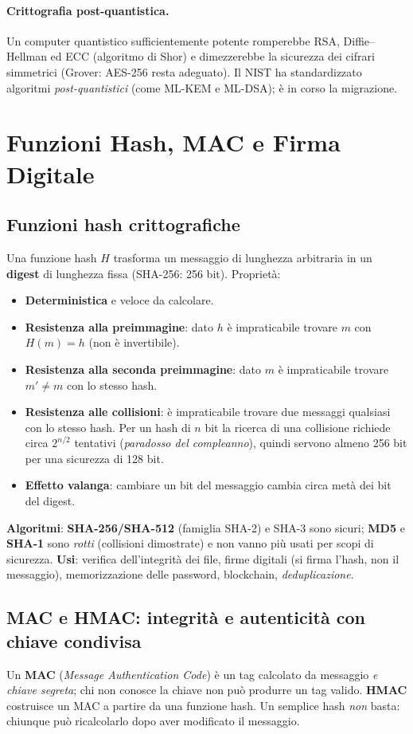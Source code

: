 \paragraph{Crittografia post-quantistica.} Un computer quantistico sufficientemente potente romperebbe RSA, Diffie--Hellman ed ECC (algoritmo di Shor) e dimezzerebbe la sicurezza dei cifrari simmetrici (Grover: AES-256 resta adeguato). Il NIST ha standardizzato algoritmi \emph{post-quantistici} (come ML-KEM e ML-DSA); è in corso la migrazione.

\section{Funzioni Hash, MAC e Firma Digitale}

\subsection{Funzioni hash crittografiche}
Una funzione hash $H$ trasforma un messaggio di lunghezza arbitraria in un \textbf{digest} di lunghezza fissa (SHA-256: 256 bit). Proprietà:
\begin{itemize}
    \item \textbf{Deterministica} e veloce da calcolare.
    \item \textbf{Resistenza alla preimmagine}: dato $h$ è impraticabile trovare $m$ con $H(m)=h$ (non è invertibile).
    \item \textbf{Resistenza alla seconda preimmagine}: dato $m$ è impraticabile trovare $m'\neq m$ con lo stesso hash.
    \item \textbf{Resistenza alle collisioni}: è impraticabile trovare due messaggi qualsiasi con lo stesso hash. Per un hash di $n$ bit la ricerca di una collisione richiede circa $2^{n/2}$ tentativi (\emph{paradosso del compleanno}), quindi servono almeno 256 bit per una sicurezza di 128 bit.
    \item \textbf{Effetto valanga}: cambiare un bit del messaggio cambia circa metà dei bit del digest.
\end{itemize}
\textbf{Algoritmi}: \textbf{SHA-256/SHA-512} (famiglia SHA-2) e SHA-3 sono sicuri; \textbf{MD5} e \textbf{SHA-1} sono \emph{rotti} (collisioni dimostrate) e non vanno più usati per scopi di sicurezza.
\textbf{Usi}: verifica dell'integrità dei file, firme digitali (si firma l'hash, non il messaggio), memorizzazione delle password, blockchain, \emph{deduplicazione}.

\subsection{MAC e HMAC: integrità e autenticità con chiave condivisa}
Un \textbf{MAC} (\emph{Message Authentication Code}) è un tag calcolato da messaggio \emph{e chiave segreta}; chi non conosce la chiave non può produrre un tag valido. \textbf{HMAC} costruisce un MAC a partire da una funzione hash. Un semplice hash \emph{non} basta: chiunque può ricalcolarlo dopo aver modificato il messaggio.

